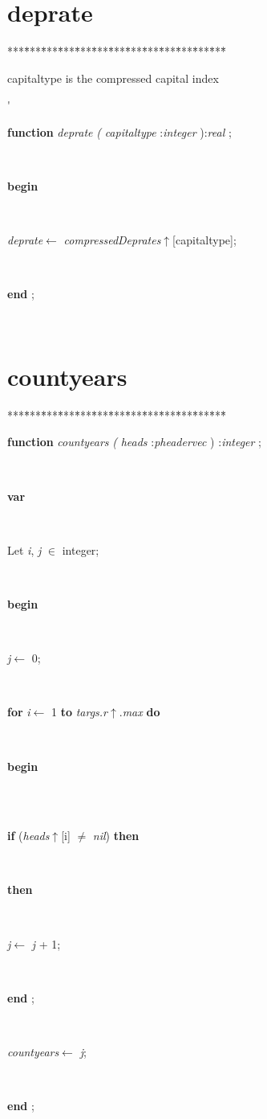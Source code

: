 \documentclass[10pt, a4paper]{article}
\begin{document}
\section{deprate}\label{sec:harmonyplandeprate}

\begin{tabbing}
***\=***\=***\=***\=***\=***\=***\=***\=***\=***\=***\=***\=***\=\kill
\parbox{3.5cm}{\scriptsize{capitaltype is the compressed capital index}}\'\parbox{14cm}{\textsf{\textbf{function}  \textit{deprate} \textit{(} \textit{capitaltype} :\textit{integer} ):\textit{real} ;}}\\
\+\parbox{14cm}{\textsf{\textbf{begin} }}\\
\parbox{14cm}{\textsf{\textit{deprate}$\leftarrow$ \textit{compressedDeprates}$\uparrow$\textit{}[capitaltype]}; }\\
\<\-\parbox{14cm}{\textsf{\textbf{end} ;}}\\
\end{tabbing}
\section{countyears}\label{sec:harmonyplancountyears}

\begin{tabbing}
***\=***\=***\=***\=***\=***\=***\=***\=***\=***\=***\=***\=***\=\kill
\parbox{14cm}{\textsf{\textbf{function}  \textit{countyears} \textit{(} \textit{heads} :\textit{pheadervec} ) :\textit{integer} ;}}\\
\+\parbox{14cm}{\textsf{\textbf{var} }}\\
\parbox{14cm}{\textsf{Let \textit{i}, \textit{j} $\in$ integer;}}\\
\-\<\+\parbox{14cm}{\textsf{\textbf{begin} }}\\
\parbox{14cm}{\textsf{\textit{j}$\leftarrow$ 0}; }\\
\+\parbox{14cm}{\textsf {\textbf {for } \textsf{\textit{i}$\leftarrow$ 1} \textbf{ to } \textsf{\textit{targs.r}$\uparrow$.\textit{max}} \textbf{ do } }}\\
\<\parbox{14cm}{\textsf{\textbf{begin} }}\\
\\
\+\parbox{14cm}{\textsf {\textbf {if } \textsf{(\textit{heads}$\uparrow$\textit{}[i] $\neq$ \textit{nil})} \textbf{ then } }}\\
\+\parbox{14cm}{\textsf{\textbf{then} }}\\
\-\-\parbox{14cm}{\textsf{\textit{j}$\leftarrow$ \textit{j} + 1}; }\\
\<\-\parbox{14cm}{\textsf{\textbf{end} ;}}\\
\parbox{14cm}{\textsf{\textit{countyears}$\leftarrow$ \textit{j}}; }\\
\<\-\parbox{14cm}{\textsf{\textbf{end} ;}}\\
\end{tabbing}
\end{document}
